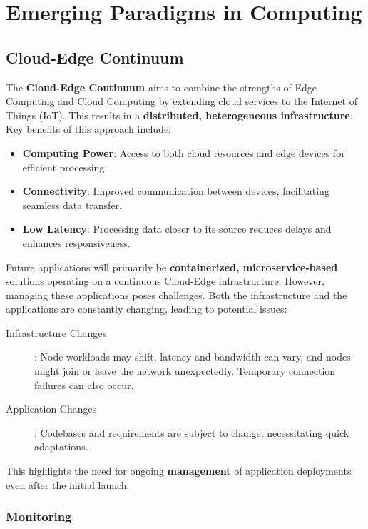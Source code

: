 \chapter{Emerging Paradigms in Computing}

\section{Cloud-Edge Continuum}

The \textbf{Cloud-Edge Continuum} aims to combine the strengths of Edge Computing and Cloud Computing by extending cloud services to the Internet of Things (IoT). This results in a \textbf{distributed, heterogeneous infrastructure}. Key benefits of this approach include:

\begin{itemize}
    \item \textbf{Computing Power}: Access to both cloud resources and edge devices for efficient processing.
    \item \textbf{Connectivity}: Improved communication between devices, facilitating seamless data transfer.
    \item \textbf{Low Latency}: Processing data closer to its source reduces delays and enhances responsiveness.
\end{itemize}

Future applications will primarily be \textbf{containerized, microservice-based} solutions operating on a continuous Cloud-Edge infrastructure. However, managing these applications poses challenges. Both the infrastructure and the applications are constantly changing, leading to potential issues:

\begin{description}
    \item[Infrastructure Changes]: Node workloads may shift, latency and bandwidth can vary, and nodes might join or leave the network unexpectedly. Temporary connection failures can also occur.
    \item[Application Changes]: Codebases and requirements are subject to change, necessitating quick adaptations.
\end{description}

\noindent This highlights the need for ongoing \textbf{management} of application deployments even after the initial launch.

\subsection{Monitoring}

